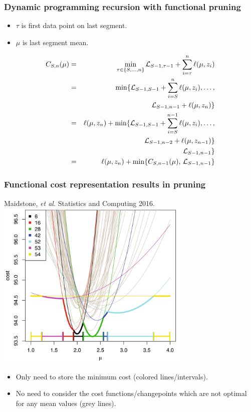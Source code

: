\documentclass{beamer}
\begin{document}
\begin{frame}
  \frametitle{Dynamic programming recursion with functional pruning}
  \begin{itemize}
  \item $\tau$ is first data point on last segment.
  \item $\mu$ is last segment mean.
  \end{itemize}
  \begin{eqnarray*}
    C_{S,n}(\mu) &=&
    \min_{\tau\in\{S, \dots, n\} }
\mathcal L_{S-1, \tau-1}
 +
\sum_{i=\tau}^{n} \ell( \mu,  z_i)\\
&=&\min\{\mathcal L_{S-1,S-1} + \sum_{i=S}^{n} \ell( \mu,  z_i), \dots,\\
    &&\hskip 0.8cm \mathcal L_{S-1,n-1} + \ell( \mu,  z_n) \}\\
&=&\ell( \mu,  z_n) + \min\{\mathcal L_{S-1,S-1} + \sum_{i=S}^{n-1} \ell( \mu,  z_i), \dots,\\
    &&\hskip 2.7cm \mathcal L_{S-1,n-2}  +\ell( \mu,  z_{n-1})\}\\
    &&\hskip 2.7cm \mathcal L_{S-1,n-1}  \}\\
&=&\ell( \mu,  z_n)+
\min\{
    C_{S,n-1}(\mu),\,  
    \mathcal L_{S-1,n-1}
\}
  \end{eqnarray*}
\end{frame}

\begin{frame}
  \frametitle{Functional cost representation results in pruning}
  
  Maidstone, {\it et al.} Statistics and Computing 2016.
\centering
\includegraphics[width=0.7\textwidth]{screenshot-Maidstone-figure-1}

\begin{itemize}
\item Only need to store the minimum cost (colored lines/intervals).
  \item No need to consider the cost functions/changepoints which are
    not optimal for any mean values (grey lines).
\end{itemize}
  
\end{frame}
\end{document}
